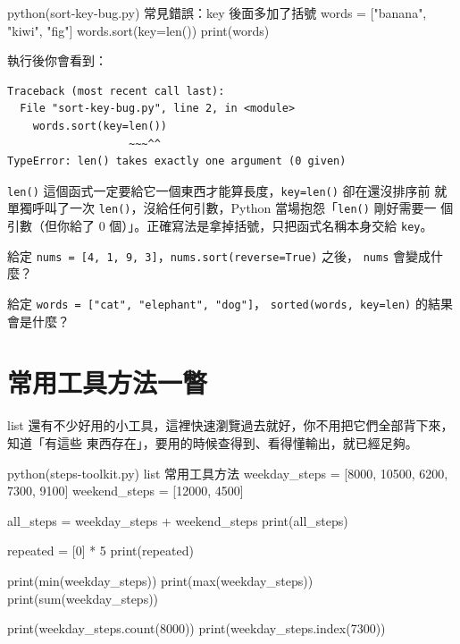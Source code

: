 
\begin{example}{python}{(sort-key-bug.py) 常見錯誤：key 後面多加了括號}
words = ["banana", "kiwi", "fig"]
words.sort(key=len())
print(words)
\end{example}

執行後你會看到：

\begin{verbatim}
Traceback (most recent call last):
  File "sort-key-bug.py", line 2, in <module>
    words.sort(key=len())
                   ~~~^^
TypeError: len() takes exactly one argument (0 given)
\end{verbatim}

\texttt{len()} 這個函式一定要給它一個東西才能算長度，\texttt{key=len()} 卻在還沒排序前
就單獨呼叫了一次 \texttt{len()}，沒給任何引數，Python 當場抱怨「\texttt{len()} 剛好需要一
個引數（但你給了 0 個）」。正確寫法是拿掉括號，只把函式名稱本身交給 \texttt{key}。

\begin{drills}[label=drills:sort-key]
\item 給定 \texttt{nums = [4, 1, 9, 3]}，\texttt{nums.sort(reverse=True)} 之後，
\texttt{nums} 會變成什麼？
\item 給定 \texttt{words = ["cat", "elephant", "dog"]}，
\texttt{sorted(words, key=len)} 的結果會是什麼？
\end{drills}

\section{常用工具方法一瞥}
\label{sec:list-tools}

list 還有不少好用的小工具，這裡快速瀏覽過去就好，你不用把它們全部背下來，知道「有這些
東西存在」，要用的時候查得到、看得懂輸出，就已經足夠。

\begin{example}{python}{(steps-toolkit.py) list 常用工具方法}
weekday_steps = [8000, 10500, 6200, 7300, 9100]
weekend_steps = [12000, 4500]

all_steps = weekday_steps + weekend_steps
print(all_steps)

repeated = [0] * 5
print(repeated)

print(min(weekday_steps))
print(max(weekday_steps))
print(sum(weekday_steps))

print(weekday_steps.count(8000))
print(weekday_steps.index(7300))
\end{example}

